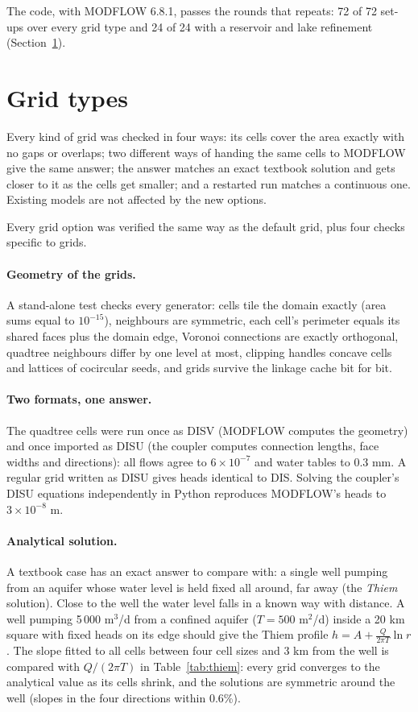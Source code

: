 The code, with MODFLOW 6.8.1, passes the rounds that  repeats: 72 of 72 set-ups
over every grid type and 24 of 24 with a reservoir and lake refinement (Section~\ref{sec:vgrids}).

\section{Grid types}\label{sec:vgrids}
\begin{plain}
Every kind of grid was checked in four ways: its cells cover the area exactly with no gaps or overlaps; two different ways of
handing the same cells to MODFLOW give the same answer; the answer matches an exact textbook solution and gets closer to it
as the cells get smaller; and a restarted run matches a continuous one. Existing models are not affected by the new options.
\end{plain}
Every grid option was verified the same way as the default grid, plus four checks specific to grids.


\paragraph{Geometry of the grids.} A stand-alone test checks every generator: cells tile the domain exactly (area sums
equal to $10^{-15}$), neighbours are symmetric, each cell's perimeter equals its shared faces plus the domain edge, Voronoi
connections are exactly orthogonal, quadtree neighbours differ by one level at most, clipping handles concave cells and
lattices of cocircular seeds, and grids survive the linkage cache bit for bit.

\paragraph{Two formats, one answer.} The quadtree cells were run once as DISV (MODFLOW computes the geometry) and once
imported as DISU (the coupler computes connection lengths, face widths and directions): all flows agree to $6\times10^{-7}$ and
water tables to 0.3 mm. A regular grid written as DISU gives heads identical to DIS. Solving the coupler's DISU equations
independently in Python reproduces MODFLOW's heads to $3\times10^{-8}$ m.

\paragraph{Analytical solution.} A textbook case has an exact answer to compare with: a single well pumping from an aquifer
whose water level is held fixed all around, far away (the \emph{Thiem} solution). Close to the well the water level falls in
a known way with distance. A well pumping 5\,000 m$^3$/d from a confined aquifer ($T=500$ m$^2$/d) inside a
20 km square with fixed heads on its edge should give the Thiem profile $h=A+\frac{Q}{2\pi T}\ln r$. The slope fitted to
all cells between four cell sizes and 3 km from the well is compared with $Q/(2\pi T)$ in Table~\ref{tab:thiem}: every grid
converges to the analytical value as its cells shrink, and the solutions are symmetric around the well (slopes in the four
directions within 0.6\%).

